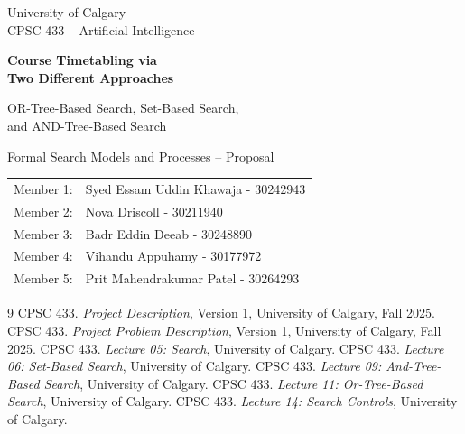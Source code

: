 \documentclass[11pt,letterpaper]{article}
\begin{document}
\begin{titlepage}
\centering
\vspace*{2cm}
{\Large University of Calgary\\CPSC 433 -- Artificial Intelligence\par}
\vspace{1.6cm}
{\Huge\bfseries Course Timetabling via\\Two Different Approaches\par}
\vspace{0.8cm}
{\Large OR-Tree-Based Search, Set-Based Search,\\and AND-Tree-Based Search\par}
\vspace{1.5cm}
{\large Formal Search Models and Processes -- Proposal\par}
\vfill
\begin{tabular}{ll}
Member 1: & Syed Essam Uddin Khawaja - 30242943\\[7pt]
Member 2: & Nova Driscoll - 30211940\\[7pt]
Member 3: & Badr Eddin Deeab - 30248890\\[7pt]
Member 4: & Vihandu Appuhamy - 30177972\\[7pt]
Member 5: & Prit Mahendrakumar Patel - 30264293\\[7pt]
\end{tabular}
\end{titlepage}

\tableofcontents
\newpage













\begin{thebibliography}{9}
 CPSC 433. \emph{Project Description}, Version 1, University of Calgary, Fall 2025.
 CPSC 433. \emph{Project Problem Description}, Version 1, University of Calgary, Fall 2025.
 CPSC 433. \emph{Lecture 05: Search}, University of Calgary.
 CPSC 433. \emph{Lecture 06: Set-Based Search}, University of Calgary.
 CPSC 433. \emph{Lecture 09: And-Tree-Based Search}, University of Calgary.
 CPSC 433. \emph{Lecture 11: Or-Tree-Based Search}, University of Calgary.
 CPSC 433. \emph{Lecture 14: Search Controls}, University of Calgary.
\end{thebibliography}
\end{document}
